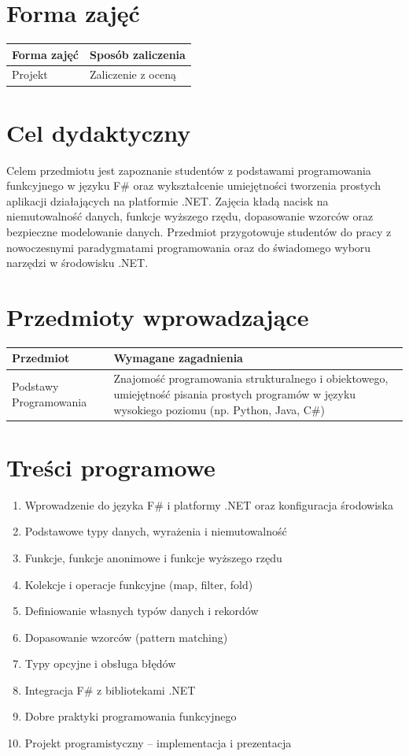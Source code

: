 \documentclass[12pt, a4paper]{article}
\begin{document}
\section{Forma zajęć}

\begin{tabular}{ll}
  \hline
  \textbf{Forma zajęć} & \textbf{Sposób zaliczenia} \\
  \hline
  Projekt & Zaliczenie z oceną \\
  \hline
\end{tabular}

\section{Cel dydaktyczny}

Celem przedmiotu jest zapoznanie studentów z podstawami programowania funkcyjnego w języku F\# oraz wykształcenie umiejętności tworzenia prostych aplikacji działających na platformie .NET. Zajęcia kładą nacisk na niemutowalność danych, funkcje wyższego rzędu, dopasowanie wzorców oraz bezpieczne modelowanie danych. Przedmiot przygotowuje studentów do pracy z nowoczesnymi paradygmatami programowania oraz do świadomego wyboru narzędzi w środowisku .NET.

\section{Przedmioty wprowadzające}

\begin{tabularx}{\textwidth}{lX}
  \hline
  \textbf{Przedmiot} & \textbf{Wymagane zagadnienia} \\
  \hline
  Podstawy Programowania & Znajomość programowania strukturalnego i obiektowego, umiejętność pisania prostych programów w języku wysokiego poziomu (np. Python, Java, C\#) \\
  \hline
\end{tabularx}

\section{Treści programowe}

\begin{enumerate}
  \item Wprowadzenie do języka F\# i platformy .NET oraz konfiguracja środowiska
  \item Podstawowe typy danych, wyrażenia i niemutowalność
  \item Funkcje, funkcje anonimowe i funkcje wyższego rzędu
  \item Kolekcje i operacje funkcyjne (map, filter, fold)
  \item Definiowanie własnych typów danych i rekordów
  \item Dopasowanie wzorców (pattern matching)
  \item Typy opcyjne i obsługa błędów
  \item Integracja F\# z bibliotekami .NET
  \item Dobre praktyki programowania funkcyjnego
  \item Projekt programistyczny – implementacja i prezentacja
\end{enumerate}
\end{document}
